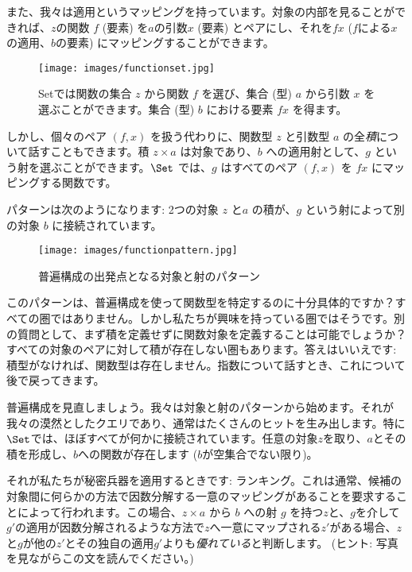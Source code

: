 また、我々は適用というマッピングを持っています。対象の内部を見ることができれば、$z$の関数 $f$ (要素) を$a$の引数$x$ (要素) とペアにし、それを$f x$ ($f$による$x$の適用、$b$の要素) にマッピングすることができます。

\begin{figure}[H]
  \centering\texttt{[image: images/functionset.jpg]}
  \caption{Setでは関数の集合 $z$ から関数 $f$ を選び、集合 (型) $a$ から引数 $x$ を選ぶことができます。集合 (型) $b$ における要素 $f x$ を得ます。}
\end{figure}

\noindent
しかし、個々のペア $(f, x)$ を扱う代わりに、関数型 $z$ と引数型 $a$ の全\emph{積}について話すこともできます。積 $z\times{}a$ は対象であり、$b$ への適用射として、$g$ という射を選ぶことができます。$\Set$ では、$g$ はすべてのペア $(f, x)$ を $f x$ にマッピングする関数です。

パターンは次のようになります: 2つの対象 $z$ と$a$ の積が、$g$ という射によって別の対象 $b$ に接続されています。

\begin{figure}[H]
  \centering
  \texttt{[image: images/functionpattern.jpg]}
  \caption{普遍構成の出発点となる対象と射のパターン}
\end{figure}

\noindent
このパターンは、普遍構成を使って関数型を特定するのに十分具体的ですか？すべての圏ではありません。しかし私たちが興味を持っている圏ではそうです。別の質問として、まず積を定義せずに関数対象を定義することは可能でしょうか？すべての対象のペアに対して積が存在しない圏もあります。答えはいいえです: 積型がなければ、関数型は存在しません。指数について話すとき、これについて後で戻ってきます。

普遍構成を見直しましょう。我々は対象と射のパターンから始めます。それが我々の漠然としたクエリであり、通常はたくさんのヒットを生み出します。特に$\Set$では、ほぼすべてが何かに接続されています。任意の対象$z$を取り、$a$とその積を形成し、$b$への関数が存在します ($b$が空集合でない限り)。

それが私たちが秘密兵器を適用するときです: ランキング。これは通常、候補の対象間に何らかの方法で因数分解する一意のマッピングがあることを要求することによって行われます。この場合、$z \times a$ から $b$ への射 $g$ を持つ$z$と、$g$を介して$g'$の適用が因数分解されるような方法で$z$へ一意にマップされる$z'$がある場合、$z$と$g$が他の$z'$とその独自の適用$g'$よりも\emph{優れている}と判断します。  (ヒント: 写真を見ながらこの文を読んでください。) 

